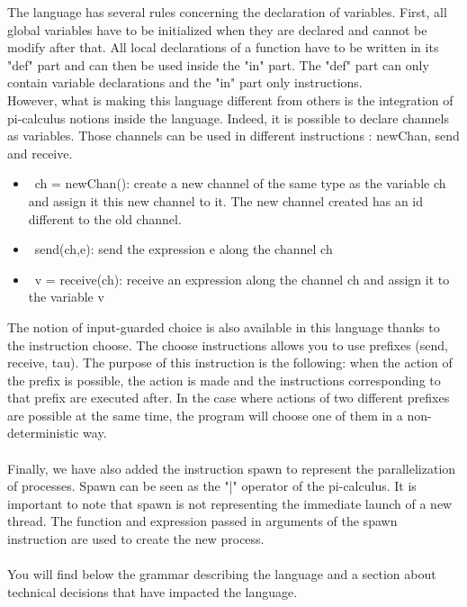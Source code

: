\documentclass[11pt]{report}
\begin{document}
\tabto{1cm}The language has several rules concerning the declaration of variables. First, all global variables have to be initialized when they are declared and cannot be modify after that. All local declarations of a function have to be written in its "def" part and can then be used inside the "in" part. The "def" part can only contain variable declarations and the "in" part only instructions. \\

\tabto{1cm}However, what is making this language different from others is the integration of pi-calculus notions inside the language. Indeed, it is possible to declare channels as variables. Those channels can be used in different instructions : newChan, send and receive.
\begin{itemize}
\item \ ch = newChan(): create a new channel of the same type as the variable ch and assign it this new channel to it. The new channel created has an id different to the old channel.
\item \ send(ch,e): send the expression e along the channel ch
\item \ v = receive(ch): receive an expression along the channel ch and assign it to the variable v
\end{itemize}

\tabto{1cm}The notion of input-guarded choice is also available in this language thanks to the instruction choose. The choose instructions allows you to use prefixes (send, receive, tau). The purpose of this instruction is the following: when the action of the prefix is possible, the action is made and the instructions corresponding to that prefix are executed after. In the case where actions of two different prefixes are possible at the same time, the program will choose one of them in a non-deterministic way.
\\ \\
\tabto{1cm} Finally, we have also added the instruction spawn to represent the parallelization of processes. Spawn can be seen as the "|" operator of the pi-calculus. It is important to note that spawn is not representing the immediate launch of a new thread. The function and expression passed in arguments of the spawn instruction are used to create the new process.
\\ \\
\tabto{1cm} You will find below the grammar describing the language and a section about technical decisions that have impacted the language.
\end{document}
